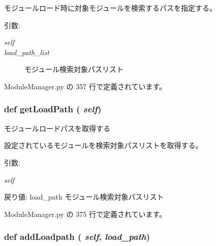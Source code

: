 モジュールロード時に対象モジュールを検索するパスを指定する。

\begin{Desc}
\item[引数:]
\begin{description}
\item[{\em self}]\item[{\em load\_\-path\_\-list}]モジュール検索対象パスリスト \end{description}
\end{Desc}


 ModuleManager.py の 357 行で定義されています。
\subsubsection{\setlength{\rightskip}{0pt plus 5cm}def getLoadPath ( {\em self})}\label{classsource__py_1_1_module_manager_1_1_module_manager_c4dbcdb67a8d40342d9a8e5e0f8843db}


モジュールロードパスを取得する 

設定されているモジュールを検索対象パスリストを取得する。

\begin{Desc}
\item[引数:]
\begin{description}
\item[{\em self}]\end{description}
\end{Desc}
\begin{Desc}
\item[戻り値:]load\_\-path モジュール検索対象パスリスト \end{Desc}


 ModuleManager.py の 375 行で定義されています。
\subsubsection{\setlength{\rightskip}{0pt plus 5cm}def addLoadpath ( {\em self},  {\em load\_\-path})}\label{classsource__py_1_1_module_manager_1_1_module_manager_b5969b573f13392c0608c4f0035c6f27}


